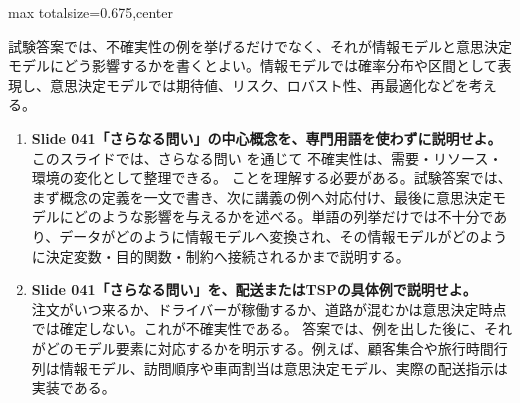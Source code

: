 \begin{adjustbox}{max totalsize={\textwidth}{0.675\textheight},center}
\begin{minipage}{\textwidth}
\begin{minipage}[t]{0.485\textwidth}
試験答案では、不確実性の例を挙げるだけでなく、それが情報モデルと意思決定モデルにどう影響するかを書くとよい。情報モデルでは確率分布や区間として表現し、意思決定モデルでは期待値、リスク、ロバスト性、再最適化などを考える。\par
{}
\begin{enumerate}
\item \textbf{Slide 041「さらなる問い」の中心概念を、専門用語を使わずに説明せよ。}\\このスライドでは、さらなる問い を通じて 不確実性は、需要・リソース・環境の変化として整理できる。 ことを理解する必要がある。試験答案では、まず概念の定義を一文で書き、次に講義の例へ対応付け、最後に意思決定モデルにどのような影響を与えるかを述べる。単語の列挙だけでは不十分であり、データがどのように情報モデルへ変換され、その情報モデルがどのように決定変数・目的関数・制約へ接続されるかまで説明する。
\item \textbf{Slide 041「さらなる問い」を、配送またはTSPの具体例で説明せよ。}\\注文がいつ来るか、ドライバーが稼働するか、道路が混むかは意思決定時点では確定しない。これが不確実性である。 答案では、例を出した後に、それがどのモデル要素に対応するかを明示する。例えば、顧客集合や旅行時間行列は情報モデル、訪問順序や車両割当は意思決定モデル、実際の配送指示は実装である。
\end{enumerate}
\end{minipage}
\end{minipage}
\end{adjustbox}

